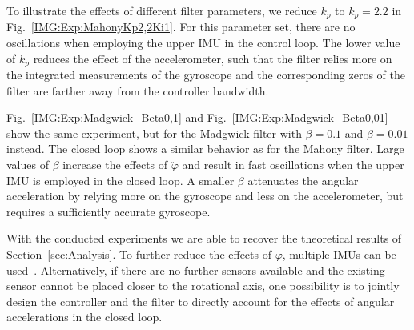 To illustrate the effects of different filter parameters, we reduce $k_p$ to $k_p=2.2$ in Fig.~\ref{IMG:Exp:MahonyKp2,2Ki1}.
For this parameter set, there are no oscillations when employing the upper \ac{IMU} in the control loop.
The lower value of $k_p$ reduces the effect of the accelerometer, such that the filter relies more on the integrated measurements of the gyroscope and the corresponding zeros of the filter are farther away from the controller bandwidth.

Fig.~\ref{IMG:Exp:Madgwick_Beta0,1} and Fig.~\ref{IMG:Exp:Madgwick_Beta0,01} show the same experiment, but for the Madgwick filter with $\beta = 0.1$ and $\beta = 0.01$ instead.
The closed loop shows a similar behavior as for the Mahony filter.
Large values of $\beta$ increase the effects of $\ddot{\varphi}$ and result in fast oscillations when the upper \ac{IMU} is employed in the closed loop.
A smaller $\beta$ attenuates the angular acceleration by relying more on the gyroscope and less on the accelerometer, but requires a sufficiently accurate gyroscope.

With the conducted experiments we are able to recover the theoretical results of Section~\ref{sec:Analysis}.
To further reduce the effects of $\ddot{\varphi}$, multiple \acp{IMU} can be used~\cite{Gajamohan2012}.
Alternatively, if there are no further sensors available and the existing sensor cannot be placed closer to the rotational axis, one possibility is to jointly design the controller and the filter to directly account for the effects of angular accelerations in the closed loop.
